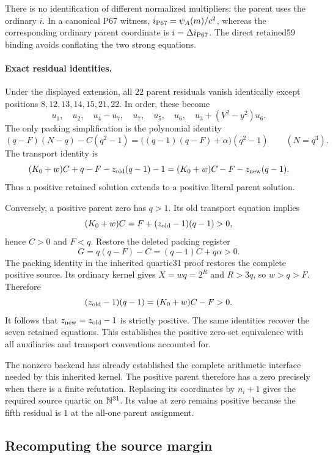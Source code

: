 There is no identification of different normalized multipliers:
the parent uses the ordinary $i$.  In a canonical P67 witness,
$i_{\rm P67}=\psi_A(m)/c^2$, whereas the corresponding ordinary
parent coordinate is $i=\Delta i_{\rm P67}$.  The direct retained59
binding avoids conflating the two strong equations.

\paragraph{Exact residual identities.}
Under the displayed extension, all $22$ parent residuals vanish
identically except positions $8,12,13,14,15,21,22$.  In order, these
become
\[
 u_1,\quad u_2,\quad u_4-u_7,\quad u_7,\quad
 u_5,\quad u_6,\quad u_3+(V^2-y^2)u_6.
\]
The only packing simplification is the polynomial identity
\[
 (q-F)(N-q)-C(q^2-1)
 =\bigl((q-1)(q-F)+\alpha\bigr)(q^2-1)
 \qquad(N=q^3).
\]
The transport identity is
\[
 (K_0+w)C+q-F-z_{\rm old}(q-1)-1
 =(K_0+w)C-F-z_{\rm new}(q-1).
\]
Thus a positive retained solution extends to a positive literal
parent solution.

Conversely, a positive parent zero has $q>1$.  Its old transport
equation implies
\[
 (K_0+w)C=F+(z_{\rm old}-1)(q-1)>0,
\]
hence $C>0$ and $F<q$.  Restore the deleted packing register
\[
 G=q(q-F)-C=(q-1)C+q\alpha>0.
\]
The packing identity in the inherited quartic31 proof restores the
complete positive source.  Its ordinary kernel gives $X=wq=2^R$
and $R>3q$, so $w>q>F$.  Therefore
\[
 (z_{\rm old}-1)(q-1)=(K_0+w)C-F>0.
\]
It follows that $z_{\rm new}=z_{\rm old}-1$ is strictly positive.
The same identities recover the seven retained equations.  This
establishes the positive zero-set equivalence with all auxiliaries
and transport conventions accounted for.

The nonzero backend has already established the complete arithmetic
interface needed by this inherited kernel.  The positive parent
therefore has a zero precisely when there is a finite refutation.
Replacing its coordinates by $n_i+1$ gives the required source
quartic on $\mathbb N^{31}$.  Its value at zero remains positive because
the fifth residual is $1$ at the all-one parent assignment.

\subsection{Recomputing the source margin}

